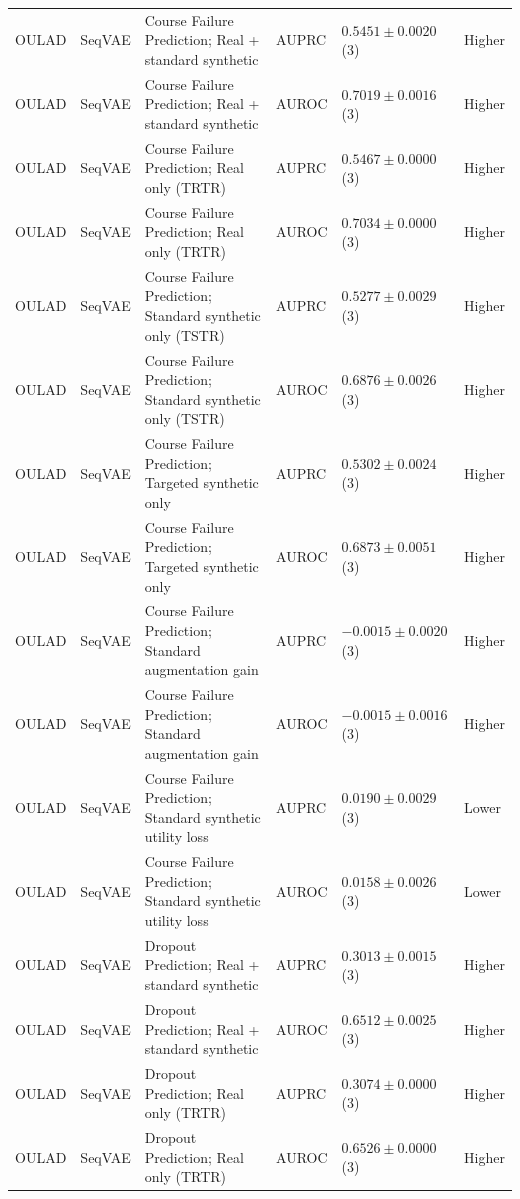 \begin{longtable}{@{}p{2.25cm}p{2.05cm}p{4.7cm}p{5.0cm}p{2.6cm}p{1.25cm}@{}}
OULAD & SeqVAE & Course Failure Prediction; Real + standard synthetic & AUPRC & $0.5451 \mathbin{\pm} 0.0020$ (3) & Higher \\
OULAD & SeqVAE & Course Failure Prediction; Real + standard synthetic & AUROC & $0.7019 \mathbin{\pm} 0.0016$ (3) & Higher \\
OULAD & SeqVAE & Course Failure Prediction; Real only (TRTR) & AUPRC & $0.5467 \mathbin{\pm} 0.0000$ (3) & Higher \\
OULAD & SeqVAE & Course Failure Prediction; Real only (TRTR) & AUROC & $0.7034 \mathbin{\pm} 0.0000$ (3) & Higher \\
OULAD & SeqVAE & Course Failure Prediction; Standard synthetic only (TSTR) & AUPRC & $0.5277 \mathbin{\pm} 0.0029$ (3) & Higher \\
OULAD & SeqVAE & Course Failure Prediction; Standard synthetic only (TSTR) & AUROC & $0.6876 \mathbin{\pm} 0.0026$ (3) & Higher \\
OULAD & SeqVAE & Course Failure Prediction; Targeted synthetic only & AUPRC & $0.5302 \mathbin{\pm} 0.0024$ (3) & Higher \\
OULAD & SeqVAE & Course Failure Prediction; Targeted synthetic only & AUROC & $0.6873 \mathbin{\pm} 0.0051$ (3) & Higher \\
OULAD & SeqVAE & Course Failure Prediction; Standard augmentation gain & AUPRC & $-0.0015 \mathbin{\pm} 0.0020$ (3) & Higher \\
OULAD & SeqVAE & Course Failure Prediction; Standard augmentation gain & AUROC & $-0.0015 \mathbin{\pm} 0.0016$ (3) & Higher \\
OULAD & SeqVAE & Course Failure Prediction; Standard synthetic utility loss & AUPRC & $0.0190 \mathbin{\pm} 0.0029$ (3) & Lower \\
OULAD & SeqVAE & Course Failure Prediction; Standard synthetic utility loss & AUROC & $0.0158 \mathbin{\pm} 0.0026$ (3) & Lower \\
OULAD & SeqVAE & Dropout Prediction; Real + standard synthetic & AUPRC & $0.3013 \mathbin{\pm} 0.0015$ (3) & Higher \\
OULAD & SeqVAE & Dropout Prediction; Real + standard synthetic & AUROC & $0.6512 \mathbin{\pm} 0.0025$ (3) & Higher \\
OULAD & SeqVAE & Dropout Prediction; Real only (TRTR) & AUPRC & $0.3074 \mathbin{\pm} 0.0000$ (3) & Higher \\
OULAD & SeqVAE & Dropout Prediction; Real only (TRTR) & AUROC & $0.6526 \mathbin{\pm} 0.0000$ (3) & Higher \\

\end{longtable}
